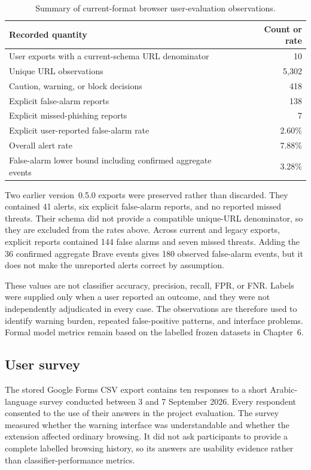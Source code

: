 \begin{table}[htbp]
\centering
\caption{Summary of current-format browser user-evaluation observations.}
\label{tab:browser-user-evaluation}
\begin{tabular}{@{}lr@{}}
\toprule
Recorded quantity & Count or rate \\
\midrule
User exports with a current-schema URL denominator & 10 \\
Unique URL observations & 5,302 \\
Caution, warning, or block decisions & 418 \\
Explicit false-alarm reports & 138 \\
Explicit missed-phishing reports & 7 \\
Explicit user-reported false-alarm rate & 2.60\% \\
Overall alert rate & 7.88\% \\
False-alarm lower bound including confirmed aggregate events & 3.28\% \\
\bottomrule
\end{tabular}
\end{table}

Two earlier version~0.5.0 exports were preserved rather than discarded. They
contained 41 alerts, six explicit false-alarm reports, and no reported missed
threats. Their schema did not provide a compatible unique-URL denominator, so
they are excluded from the rates above. Across current and legacy exports,
explicit reports contained 144 false alarms and seven missed threats. Adding
the 36 confirmed aggregate Brave events gives 180 observed false-alarm events,
but it does not make the unreported alerts correct by assumption.

These values are not classifier accuracy, precision, recall, FPR, or FNR.
Labels were supplied only when a user reported an outcome, and they were not
independently adjudicated in every case. The observations are therefore used
to identify warning burden, repeated false-positive patterns, and interface
problems. Formal model metrics remain based on the labelled frozen datasets in
Chapter~6.

\subsection{User survey}

The stored Google Forms CSV export contains ten responses to a short
Arabic-language survey conducted between 3 and 7 September 2026. Every
respondent consented to the use of their answers in the project evaluation.
The survey measured whether the warning interface was understandable and
whether the extension affected ordinary browsing. It did not ask participants
to provide a complete labelled browsing history, so its answers are usability
evidence rather than classifier-performance metrics.

